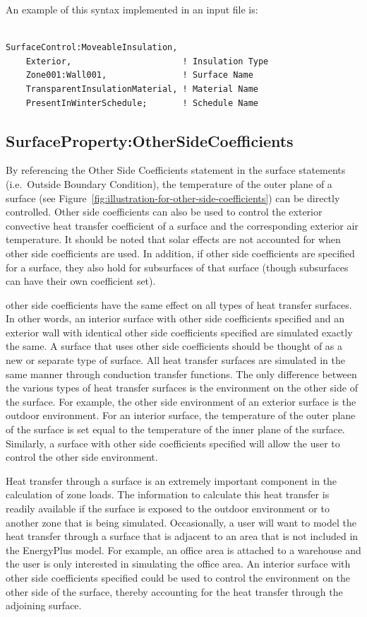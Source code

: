 An example of this syntax implemented in an input file is:

\begin{lstlisting}

SurfaceControl:MoveableInsulation,
    Exterior,                      ! Insulation Type
    Zone001:Wall001,               ! Surface Name
    TransparentInsulationMaterial, ! Material Name
    PresentInWinterSchedule;       ! Schedule Name
\end{lstlisting}

\subsection{SurfaceProperty:OtherSideCoefficients}\label{surfacepropertyothersidecoefficients}

By referencing the Other Side Coefficients statement in the surface statements (i.e.~Outside Boundary Condition), the temperature of the outer plane of a surface (see Figure~\ref{fig:illustration-for-other-side-coefficients}) can be directly controlled. Other side coefficients can also be used to control the exterior convective heat transfer coefficient of a surface and the corresponding exterior air temperature. It should be noted that solar effects are not accounted for when other side coefficients are used. In addition, if other side coefficients are specified for a surface, they also hold for subsurfaces of that surface (though subsurfaces can have their own coefficient set).

other side coefficients have the same effect on all types of heat transfer surfaces. In other words, an interior surface with other side coefficients specified and an exterior wall with identical other side coefficients specified are simulated exactly the same. A surface that uses other side coefficients should be thought of as a new or separate type of surface. All heat transfer surfaces are simulated in the same manner through conduction transfer functions. The only difference between the various types of heat transfer surfaces is the environment on the other side of the surface. For example, the other side environment of an exterior surface is the outdoor environment. For an interior surface, the temperature of the outer plane of the surface is set equal to the temperature of the inner plane of the surface. Similarly, a surface with other side coefficients specified will allow the user to control the other side environment.

Heat transfer through a surface is an extremely important component in the calculation of zone loads. The information to calculate this heat transfer is readily available if the surface is exposed to the outdoor environment or to another zone that is being simulated. Occasionally, a user will want to model the heat transfer through a surface that is adjacent to an area that is not included in the EnergyPlus model. For example, an office area is attached to a warehouse and the user is only interested in simulating the office area. An interior surface with other side coefficients specified could be used to control the environment on the other side of the surface, thereby accounting for the heat transfer through the adjoining surface.

